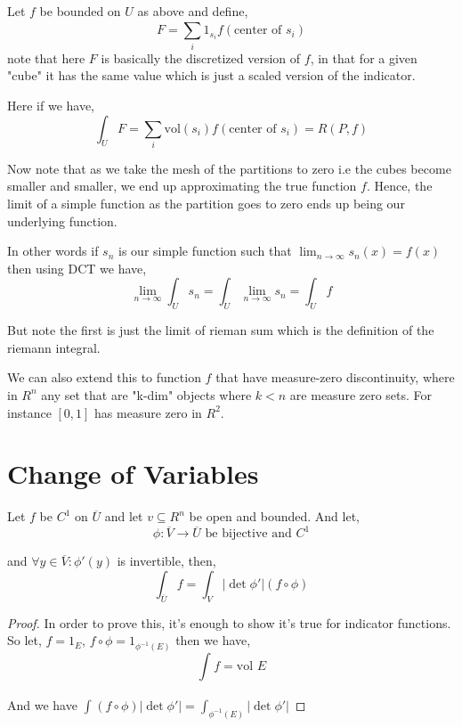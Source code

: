\begin{eg}
  Let $f$ be bounded on $U$ as above and define, 
  \[
    F = \sum_{i}^{} 1_{s_i} f(\text{center of $s_i$})
  \]
note that here $F$ is basically the discretized version of $f$, in that for a given "cube" it has the same value which is just a scaled version of the indicator.
\end{eg}

Here if we have, 
\[
  \int_{U}^{}  F = \sum_{i}^{} \text{vol}(s_i)f(\text{center of $s_i$}) = R(P, f)
\]

Now note that as we take the mesh of the partitions to zero i.e the cubes become smaller and smaller, we end up approximating the true function $f$. Hence, the limit of a simple function as the partition goes to zero ends up being our underlying function. 
\vspace{1em}

In other words if $s_n$ is our simple  function such that $\lim_{n \to \infty} s_n(x) = f(x)$ then using DCT we have, 
\[
  \lim_{n \to \infty}  \int_{U}^{} s_n = \int_{U}^{} \lim_{n \to \infty} s_n = \int_{U}^{} f
\]

But note the first is just the limit of rieman sum which is the definition of the riemann integral.

\vspace{1em}

We can also extend this to function $f$ that have measure-zero discontinuity, where in $R^{n}$ any set that are "k-dim" objects where $k < n$ are measure zero sets. For instance $[0, 1]$ has measure zero in $R^2$.


\section{Change of Variables}
Let $f$ be $C^{1}$ on $\overline{U}$ and let $v \subseteq R^{n}$ be open and bounded. And let, 
\[
  \phi: \overline{V} \to \overline{U} \text{ be bijective and } C^{1}
\]

and $\forall y \in \overline{V}: \phi'(y)$ is invertible, then, 
\[
  \int_{\overline{U}}^{}  f = \int_{V}^{}  | \det \phi'| (f \circ \phi)
\]

\begin{proof}
  In order to prove this, it's enough to show it's true for indicator functions. So let, $f = 1_E$, $f \circ \phi = 1_{\phi^{-1}(E)}$ then we have, 
  \[
    \int_{}^{} f = \text{vol }E
  \]

  And we have $\int_{}^{}(f \circ \phi) |\det \phi'| = \int_{\phi^{-1}(E)}^{}  | \det \phi'| $
\end{proof}

